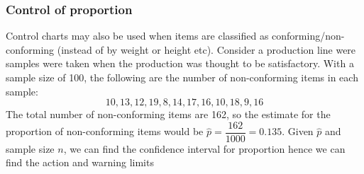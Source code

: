     \subsubsection{Control of proportion}
        Control charts may also be used when items are classified as conforming/non-conforming (instead of by weight or height etc). Consider a production line were samples were taken when the production was thought to be satisfactory. With a sample size of 100, the following are the number of non-conforming items in each sample:
        $$
        10, 13, 12, 19, 8, 14, 17, 16, 10, 18, 9, 16
        $$
        The total number of non-conforming items are 162, so the estimate for the proportion of non-conforming items would be $\hat{p} = \dfrac{162}{1000} = 0.135$. Given $\hat{p}$ and sample size $n$, we can find the confidence interval for proportion hence we can find the action and warning limits

